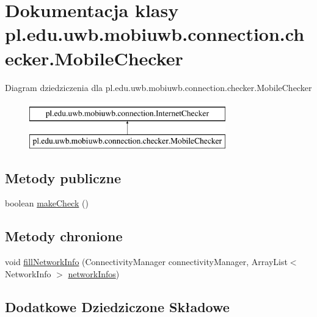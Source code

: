 \hypertarget{classpl_1_1edu_1_1uwb_1_1mobiuwb_1_1connection_1_1checker_1_1_mobile_checker}{}\section{Dokumentacja klasy pl.\+edu.\+uwb.\+mobiuwb.\+connection.\+checker.\+Mobile\+Checker}
\label{classpl_1_1edu_1_1uwb_1_1mobiuwb_1_1connection_1_1checker_1_1_mobile_checker}
Diagram dziedziczenia dla pl.\+edu.\+uwb.\+mobiuwb.\+connection.\+checker.\+Mobile\+Checker\begin{figure}[H]
\begin{center}
\leavevmode
\includegraphics[height=2.000000cm]{classpl_1_1edu_1_1uwb_1_1mobiuwb_1_1connection_1_1checker_1_1_mobile_checker}
\end{center}
\end{figure}
\subsection*{Metody publiczne}
\begin{DoxyCompactItemize}
\item 
boolean \hyperlink{classpl_1_1edu_1_1uwb_1_1mobiuwb_1_1connection_1_1checker_1_1_mobile_checker_af37e8995d09e77acaa0372352e57de95}{make\+Check} ()
\end{DoxyCompactItemize}
\subsection*{Metody chronione}
\begin{DoxyCompactItemize}
\item 
void \hyperlink{classpl_1_1edu_1_1uwb_1_1mobiuwb_1_1connection_1_1checker_1_1_mobile_checker_a17d511533bf42c4ff0e9468b4f6f9fde}{fill\+Network\+Info} (Connectivity\+Manager connectivity\+Manager, Array\+List$<$ Network\+Info $>$ \hyperlink{classpl_1_1edu_1_1uwb_1_1mobiuwb_1_1connection_1_1_internet_checker_a2edc06b95c5a74eee801d1dd2643b464}{network\+Infos})
\end{DoxyCompactItemize}
\subsection*{Dodatkowe Dziedziczone Składowe}


